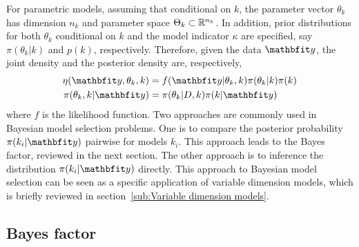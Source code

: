 For parametric models, assuming that conditional on $k$, the
parameter vector $\theta_k$ has dimension $n_k$ and parameter space
$\Theta_k\subset\mathbb{R}^{n_k}$. In addition, prior distributions for both $\theta_k$
conditional on $k$ and the model indicator $\kappa$ are specified,
say $\pi(\theta_k|k)$ and $p(k)$, respectively. Therefore,
given the data $\data$, the joint density and the posterior density are,
respectively,
\begin{align}
  \eta(\data,\theta_k,k)
  &= f(\data|\theta_k,k)\pi(\theta_k|k)\pi(k)
  \label{eq:full joint}\\
  \pi(\theta_k,k|\data)
  &= \pi(\theta_k|D,k)\pi(k|\data)
  \label{eq:full posterior}
\end{align}
where $f$ is the likelihood function. Two approaches are commonly used in
Bayesian model selection problems. One is to compare the posterior probability
$\pi(k_i|\data)$ pairwise for models $k_i$. This approach leads to
the Bayes factor, reviewed in the next section. The other approach is to
inference the distribution $\pi(k_i|\data)$ directly. This approach to
Bayesian model selection can be seen as a specific application of variable
dimension models, which is briefly reviewed in section~\ref{sub:Variable
  dimension models}.

\subsection{Bayes factor}
\label{sub:Bayes factor}

